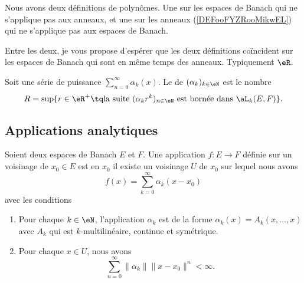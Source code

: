 \begin{normaltext}
	Nous avons deux définitions de polynômes. Une sur les espaces de Banach qui ne s'applique pas aux anneaux, et une sur les anneaux (\ref{DEFooFYZRooMikwEL}) qui ne s'applique pas aux espaces de Banach.

	Entre les deux, je vous propose d'espérer que les deux définitions coïncident sur les espaces de Banach qui sont en même temps des anneaux. Typiquement \( \eR\).
\end{normaltext}

\begin{definition}	\label{DEFooCAWCooWHLpwl}
	Soit une série de puissance \( \sum_{n=0}^{\infty}\alpha_k(x)\). Le  de \( (\alpha_k)_{k\in \eN}\) est le nombre
	\begin{equation}
		R=\sup\{ r\in \eR^+\tq \text{la suite \( (\alpha_kr^k)_{n\in \eN}\) est bornée dans \( \aL_k(E,F)\)} \}.
	\end{equation}
\end{definition}


\subsection{Applications analytiques}

\begin{definition}	\label{DEFooAIHMooKbWsBt}
	Soient deux espaces de Banach \( E\) et \( F\). Une application \(f \colon E\to F  \) définie sur un voisinage de \( x_0\in E\) est  en \( x_0\) il existe un voisinage \( U\) de \( x_0\) sur lequel nous avons
	\begin{equation}		\label{EQooWATIooCCmlbT}
		f(x)=\sum_{k=0}^{\infty}\alpha_k(x-x_0)
	\end{equation}
	avec les conditions
	\begin{enumerate}
		\item
		      Pour chaque \( k\in \eN\), l'application \( \alpha_k\) est de la forme \( \alpha_k(x)=A_k(x,\ldots,x)\) avec \( A_k\) qui est \( k\)-multilinéaire, continue et symétrique.
		\item
		      Pour chaque \( x\in U\), nous avons
		      \begin{equation}	\label{EQooQYBGooKyoNHA}
			      \sum_{n=0}^{\infty}\| \alpha_k \|\| x-x_0 \|^n<\infty.
		      \end{equation}
	\end{enumerate}
\end{definition}


